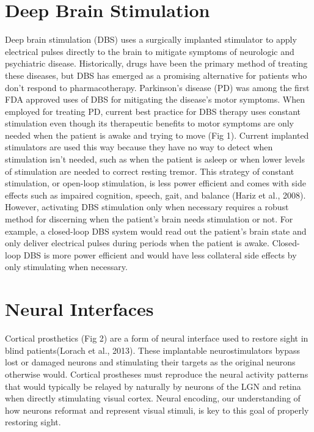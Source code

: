 \documentclass{templates/ucdenverthesis}
\begin{document}
\hypertarget{sec:dbs}{%
\section{Deep Brain Stimulation}\label{sec:dbs}}

Deep brain stimulation (DBS) uses a surgically implanted stimulator to apply electrical pulses directly to the brain to mitigate symptoms of neurologic and psychiatric disease. Historically, drugs have been the primary method of treating these diseases, but DBS has emerged as a promising alternative for patients who don't respond to pharmacotherapy. Parkinson's disease (PD) was among the first FDA approved uses of DBS for mitigating the disease's motor symptoms. When employed for treating PD, current best practice for DBS therapy uses constant stimulation even though its therapeutic benefits to motor symptoms are only needed when the patient is awake and trying to move (Fig 1). Current implanted stimulators are used this way because they have no way to detect when stimulation isn't needed, such as when the patient is asleep or when lower levels of stimulation are needed to correct resting tremor. This strategy of constant stimulation, or open-loop stimulation, is less power efficient and comes with side effects such as impaired cognition, speech, gait, and balance (Hariz et al., 2008). However, activating DBS stimulation only when necessary requires a robust method for discerning when the patient's brain needs stimulation or not. For example, a closed-loop DBS system would read out the patient's brain state and only deliver electrical pulses during periods when the patient is awake. Closed-loop DBS is more power efficient and would have less collateral side effects by only stimulating when necessary.

\hypertarget{sec:neuralinterfaces}{%
\section{Neural Interfaces}\label{sec:neuralinterfaces}}

Cortical prosthetics (Fig 2) are a form of neural interface used to restore sight in blind patients(Lorach et al., 2013). These implantable neurostimulators bypass lost or damaged neurons and stimulating their targets as the original neurons otherwise would. Cortical prostheses must reproduce the neural activity patterns that would typically be relayed by naturally by neurons of the LGN and retina when directly stimulating visual cortex. Neural encoding, our understanding of how neurons reformat and represent visual stimuli, is key to this goal of properly restoring sight.
\end{document}
